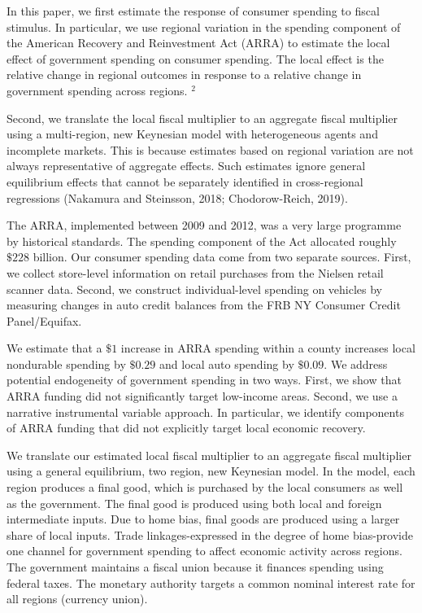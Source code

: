 \documentclass[10pt]{article}
\begin{document}
In this paper, we first estimate the response of consumer spending to fiscal stimulus. In particular, we use regional variation in the spending component of the American Recovery and Reinvestment Act (ARRA) to estimate the local effect of government spending on consumer spending. The local effect is the relative change in regional outcomes in response to a relative change in government spending across regions. ${ }^{2}$

Second, we translate the local fiscal multiplier to an aggregate fiscal multiplier using a multi-region, new Keynesian model with heterogeneous agents and incomplete markets. This is because estimates based on regional variation are not always representative of aggregate effects. Such estimates ignore general equilibrium effects that cannot be separately identified in cross-regional regressions (Nakamura and Steinsson, 2018; Chodorow-Reich, 2019).

The ARRA, implemented between 2009 and 2012, was a very large programme by historical standards. The spending component of the Act allocated roughly $\$ 228$ billion. Our consumer spending data come from two separate sources. First, we collect store-level information on retail purchases from the Nielsen retail scanner data. Second, we construct individual-level spending on vehicles by measuring changes in auto credit balances from the FRB NY Consumer Credit Panel/Equifax.

We estimate that a $\$ 1$ increase in ARRA spending within a county increases local nondurable spending by $\$ 0.29$ and local auto spending by $\$ 0.09$. We address potential endogeneity of government spending in two ways. First, we show that ARRA funding did not significantly target low-income areas. Second, we use a narrative instrumental variable approach. In particular, we identify components of ARRA funding that did not explicitly target local economic recovery.

We translate our estimated local fiscal multiplier to an aggregate fiscal multiplier using a general equilibrium, two region, new Keynesian model. In the model, each region produces a final good, which is purchased by the local consumers as well as the government. The final good is produced using both local and foreign intermediate inputs. Due to home bias, final goods are produced using a larger share of local inputs. Trade linkages-expressed in the degree of home bias-provide one channel for government spending to affect economic activity across regions. The government maintains a fiscal union because it finances spending using federal taxes. The monetary authority targets a common nominal interest rate for all regions (currency union).
\end{document}
